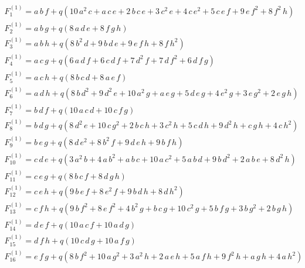 \begin{align*}
F_{1}^{(1)} = a\,b\,f + q\left(10\,a^{2}\,c+a\,c\,e+2\,b\,c\,e+3\,c^{2}\,e+4\,c\,e^{2}+5\,c\,e\,f+9\,e\,f^{2}+8\,f^{2}\,h\right)\\
F_{2}^{(1)} = a\,b\,g + q\left(8\,a\,d\,e+8\,f\,g\,h\right)\\
F_{3}^{(1)} = a\,b\,h + q\left(8\,b^{2}\,d+9\,b\,d\,e+9\,e\,f\,h+8\,f\,h^{2}\right)\\
F_{4}^{(1)} = a\,c\,g + q\left(6\,a\,d\,f+6\,c\,d\,f+7\,d^{2}\,f+7\,d\,f^{2}+6\,d\,f\,g\right)\\
F_{5}^{(1)} = a\,c\,h + q\left(8\,b\,c\,d+8\,a\,e\,f\right)\\
F_{6}^{(1)} = a\,d\,h + q\left(8\,b\,d^{2}+9\,d^{2}\,e+10\,a^{2}\,g+a\,e\,g+5\,d\,e\,g+4\,e^{2}\,g+3\,e\,g^{2}+2\,e\,g\,h\right)\\
F_{7}^{(1)} = b\,d\,f + q\left(10\,a\,c\,d+10\,c\,f\,g\right)\\
F_{8}^{(1)} = b\,d\,g + q\left(8\,d^{2}\,e+10\,c\,g^{2}+2\,b\,c\,h+3\,c^{2}\,h+5\,c\,d\,h+9\,d^{2}\,h+c\,g\,h+4\,c\,h^{2}\right)\\
F_{9}^{(1)} = b\,e\,g + q\left(8\,d\,e^{2}+8\,b^{2}\,f+9\,d\,e\,h+9\,b\,f\,h\right)\\
F_{10}^{(1)} = c\,d\,e + q\left(3\,a^{2}\,b+4\,a\,b^{2}+a\,b\,c+10\,a\,c^{2}+5\,a\,b\,d+9\,b\,d^{2}+2\,a\,b\,e+8\,d^{2}\,h\right)\\
F_{11}^{(1)} = c\,e\,g + q\left(8\,b\,c\,f+8\,d\,g\,h\right)\\
F_{12}^{(1)} = c\,e\,h + q\left(9\,b\,e\,f+8\,e^{2}\,f+9\,b\,d\,h+8\,d\,h^{2}\right)\\
F_{13}^{(1)} = c\,f\,h + q\left(9\,b\,f^{2}+8\,e\,f^{2}+4\,b^{2}\,g+b\,c\,g+10\,c^{2}\,g+5\,b\,f\,g+3\,b\,g^{2}+2\,b\,g\,h\right)\\
F_{14}^{(1)} = d\,e\,f + q\left(10\,a\,c\,f+10\,a\,d\,g\right)\\
F_{15}^{(1)} = d\,f\,h + q\left(10\,c\,d\,g+10\,a\,f\,g\right)\\
F_{16}^{(1)} = e\,f\,g + q\left(8\,b\,f^{2}+10\,a\,g^{2}+3\,a^{2}\,h+2\,a\,e\,h+5\,a\,f\,h+9\,f^{2}\,h+a\,g\,h+4\,a\,h^{2}\right)
\end{align*}
